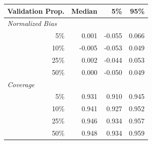 \begin{tabular}[t]{r|rrr}
\toprule
Validation Prop. & Median & 5\% & 95\% \\
\midrule
\multicolumn{1}{l|}{\textit{Normalized Bias}} \\
5\% & 0.001 & -0.055 & 0.066 \\
10\% & -0.005 & -0.053 & 0.049 \\
25\% & 0.002 & -0.044 & 0.053 \\
50\% & 0.000 & -0.050 & 0.049 \\
\midrule 
\multicolumn{1}{l|}{\textit{Coverage}} \\
5\% & 0.931 & 0.910 & 0.945 \\
10\% & 0.941 & 0.927 & 0.952 \\
25\% & 0.946 & 0.934 & 0.957 \\
50\% & 0.948 & 0.934 & 0.959 \\
\bottomrule
\end{tabular}